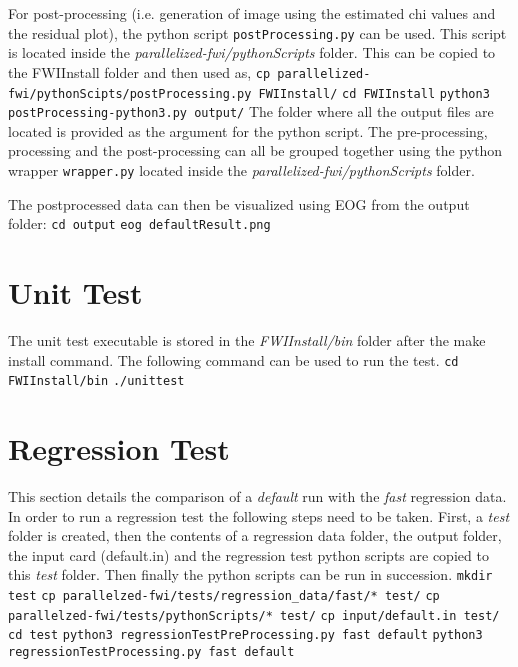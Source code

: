 \documentclass[10pt]{article}
\begin{document}
\newpage
\noindent For post-processing (i.e. generation of image using the estimated chi values and the residual plot), the python script \texttt{postProcessing.py} can be used. This script is located inside the \textit{parallelized-fwi/pythonScripts} folder. This can be copied to the FWIInstall folder and then used as,
\newline
\texttt{cp parallelized-fwi/pythonScipts/postProcessing.py FWIInstall/}
\newline
\texttt{cd FWIInstall}
\newline
\texttt{python3 postProcessing-python3.py output/}
\newline
The folder where all the output files are located is provided as the argument for the python script. The pre-processing, processing and the post-processing can all be grouped together using the python wrapper \texttt{wrapper.py} located inside the \textit{parallelized-fwi/pythonScripts} folder.

\noindent The postprocessed data can then be visualized using EOG from the output folder:
\newline
\texttt{cd output}
\newline
\texttt{eog defaultResult.png}
\newline
 
\section{Unit Test}

The unit test executable is stored in the \textit{FWIInstall/bin} folder after the make install command. The following command can be used to run the test.
\newline
\texttt{cd FWIInstall/bin}
\newline
\texttt{./unittest}


\section{Regression Test}

This section details the comparison of a \textit{default} run with the \textit{fast} regression data. In order to run a regression test the following steps need to be taken. First, a \textit{test} folder is created, then the contents of a regression data folder, the output folder, the input card (default.in) and the regression test python scripts are copied to this \textit{test} folder. Then finally the python scripts can be run in succession.  
\newline
\texttt{mkdir test}
\newline
\texttt{cp parallelzed-fwi/tests/regression\_data/fast/* test/}
\newline
\texttt{cp parallelzed-fwi/tests/pythonScripts/* test/}
\newline
\texttt{cp input/default.in test/}
\newline
\texttt{cd test}
\newline
\texttt{python3 regressionTestPreProcessing.py fast default}
\newline
\texttt{python3 regressionTestProcessing.py fast default}
\end{document}
